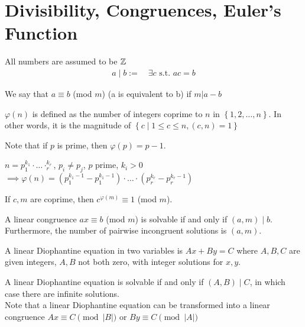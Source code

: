 \documentclass{memoir}
\begin{document}
\tableofcontents

\chapter{Divisibility, Congruences, Euler's Function}
All numbers are assumed to be \(\mathbb{Z}\)\\
\begin{align*}
	a\mid b := \quad \exists c \text{ s.t. } ac = b
\end{align*}
\begin{defn}
	We say that \(a \equiv b\) (mod \(m\)) (a is equivalent to b)  if \(m|a-b\) 
\end{defn}
\begin{defn}
	\(\varphi(n)\) is defined as the number of integers coprime to \(n\) in \(\left\{ 1,2,\ldots,n \right\} \). In other words, it is the magnitude of \(\left\{ c \mid 1\leq c\leq n, (c,n) = 1 \right\} \)
\end{defn}
Note that if \(p\) is prime, then \(\varphi(p) = p-1\).
\begin{thm}
	\(n = p_1^{k_1}\cdot\ldots\cdotp_r^{k_r}\), \(p_i \neq p_j\), \(p\) prime, \(k_i > 0\) \(\implies \varphi(n) = (p_1^{k_1-1}-p_1^{k_1-1})\cdot\ldots\cdot (p_r^{k_r}-p_r^{k_r-1})\)
\end{thm}
\begin{thm}
	If \(c,m\) are coprime, then \(c^{\varphi(m)} \equiv 1\) (mod \(m\)).
\end{thm}
\begin{thm}
	A linear congruence \(ax \equiv b\) (mod \(m\)) is solvable if and only if \((a,m) \mid b\). Furthermore, the number of pairwise incongruent solutions is \((a,m)\).
\end{thm}
\begin{defn}
	A linear Diophantine equation in two variables is \(Ax+By=C\) where \(A,B,C\) are given integers, \(A,B\) not both zero, with integer solutions for  \(x,y \).
\end{defn}
A linear Diophantine equation is solvable if and only if \((A,B)\mid C\), in which case there are infinite solutions.\\
Note that a linear Diophantine equation can be transformed into a linear congruence \(Ax \equiv C \pmod {\left| B \right|}\) or \(By \equiv C \pmod {\left| A \right|} \)
\end{document}
